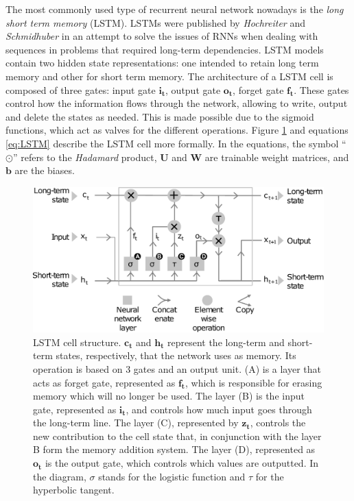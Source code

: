 The most commonly used type of recurrent neural network nowadays is the \textit{long short term memory} (LSTM). LSTMs were published by  \textit{Hochreiter} and \textit{Schmidhuber} \autocite{Schmidhuber1997} in an attempt to solve the issues of RNNs when dealing with sequences in problems that required long-term dependencies. LSTM models contain two hidden state representations: one intended to retain long term memory and other for short term memory. The architecture of a LSTM cell is composed of three gates: input gate $\mathbf{i_t}$, output gate $\mathbf{o_t}$, forget gate $\mathbf{f_t}$. These gates control how the information flows through the network, allowing to write, output and delete the states as needed. This is made possible due to the sigmoid functions, which act as valves for the different operations. Figure \ref{fig:lstm} and equations \ref{eq:LSTM} describe the LSTM cell more formally. In the equations, the symbol ``$\odot$'' refers to the \textit{Hadamard} product, $\mathbf{U}$ and $\mathbf{W}$ are trainable weight matrices, and $\mathbf{b}$ are the biases.

\begin{figure}
	\centering
	\includegraphics[width=0.7\linewidth]{background/images/LSTM}
	\caption[LSTM cell structure]{LSTM cell structure. $\mathbf{c_t}$ and $\mathbf{h_t}$ represent the long-term and short-term states, respectively, that the network uses as memory. Its operation is based on 3 gates and an output unit. (A) is a layer that acts as forget gate, represented as $\mathbf{f_t}$, which is responsible for erasing memory which will no longer be used. The layer (B) is the input gate, represented as $\mathbf{i_t}$, and controls how much input goes through the long-term line. The layer (C), represented by $\mathbf{z_t}$, controls the new contribution to the cell state that, in conjunction with the layer B form the memory addition system. The layer (D), represented as $\mathbf{o_t}$ is the output gate, which controls which values are outputted. In the diagram, $\sigma$ stands for the logistic function and $\tau$ for the hyperbolic tangent.}
	\label{fig:lstm}
\end{figure}



